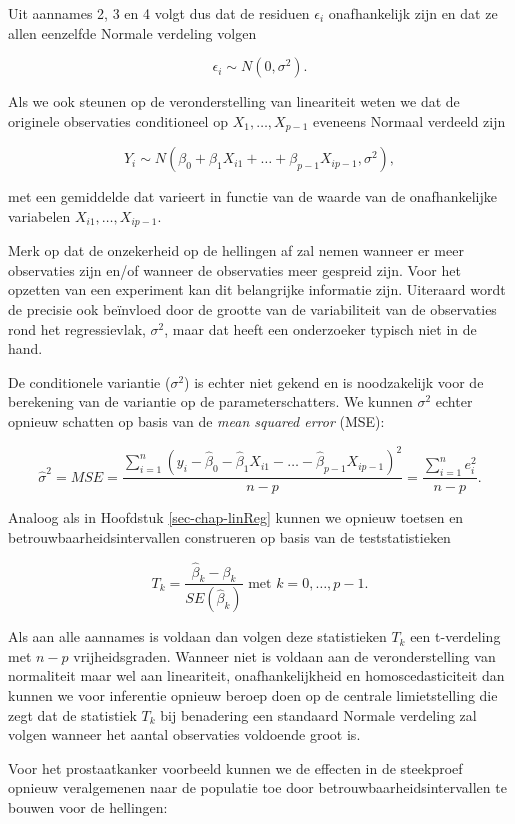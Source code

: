 \documentclass[
  dutch,
  letterpaper,
  12pt]{book}
\theoremstyle{definition}
\theoremstyle{definition}
\theoremstyle{definition}
\theoremstyle{remark}
\begin{document}
Uit aannames 2, 3 en 4 volgt dus dat de residuen \(\epsilon_i\)
onafhankelijk zijn en dat ze allen eenzelfde Normale verdeling volgen

\[\epsilon_i \sim N(0,\sigma^2).\]

Als we ook steunen op de veronderstelling van lineariteit weten we dat
de originele observaties conditioneel op \(X_1,\ldots,X_{p-1}\) eveneens
Normaal verdeeld zijn

\[Y_i\sim N(\beta_0+\beta_1 X_{i1}+\ldots+\beta_{p-1} X_{ip-1},\sigma^2),\]

met een gemiddelde dat varieert in functie van de waarde van de
onafhankelijke variabelen \(X_{i1},\ldots,X_{ip-1}\).

Merk op dat de onzekerheid op de hellingen af zal nemen wanneer er meer
observaties zijn en/of wanneer de observaties meer gespreid zijn. Voor
het opzetten van een experiment kan dit belangrijke informatie zijn.
Uiteraard wordt de precisie ook beïnvloed door de grootte van de
variabiliteit van de observaties rond het regressievlak, \(\sigma^2\),
maar dat heeft een onderzoeker typisch niet in de hand.

De conditionele variantie (\(\sigma^2\)) is echter niet gekend en is
noodzakelijk voor de berekening van de variantie op de
parameterschatters. We kunnen \(\sigma^2\) echter opnieuw schatten op
basis van de \emph{mean squared error} (MSE):

\[\hat\sigma^2=MSE=\frac{\sum\limits_{i=1}^n \left(y_i-\hat\beta_0-\hat\beta_1 X_{i1}-\ldots-\hat\beta_{p-1} X_{ip-1}\right)^2}{n-p}=\frac{\sum\limits_{i=1}^n e^2_i}{n-p}.\]

Analoog als in Hoofdstuk \ref{sec-chap-linReg} kunnen we opnieuw toetsen
en betrouwbaarheidsintervallen construeren op basis van de
teststatistieken

\[T_k=\frac{\hat{\beta}_k-\beta_k}{SE(\hat{\beta}_k)} \text{ met } k=0, \ldots, p-1.\]

Als aan alle aannames is voldaan dan volgen deze statistieken \(T_k\)
een t-verdeling met \(n-p\) vrijheidsgraden. Wanneer niet is voldaan aan
de veronderstelling van normaliteit maar wel aan lineariteit,
onafhankelijkheid en homoscedasticiteit dan kunnen we voor inferentie
opnieuw beroep doen op de centrale limietstelling die zegt dat de
statistiek \(T_k\) bij benadering een standaard Normale verdeling zal
volgen wanneer het aantal observaties voldoende groot is.

Voor het prostaatkanker voorbeeld kunnen we de effecten in de steekproef
opnieuw veralgemenen naar de populatie toe door
betrouwbaarheidsintervallen te bouwen voor de hellingen:
\end{document}
